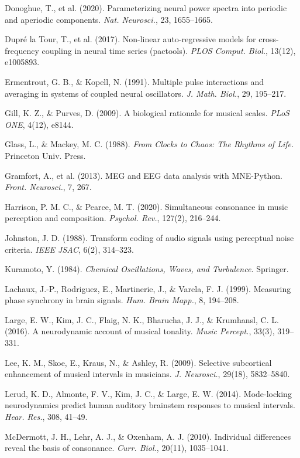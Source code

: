 \documentclass[11pt]{article}
\begin{document}
\begin{list}{}{\setlength{\itemsep}{1pt}\setlength{\leftmargin}{1.2em}\setlength{\itemindent}{-1.2em}}
\item Donoghue, T., et al. (2020). Parameterizing neural power spectra into periodic and aperiodic components. \emph{Nat. Neurosci.}, 23, 1655–1665.
\item Dupré la Tour, T., et al. (2017). Non-linear auto-regressive models for cross-frequency coupling in neural time series (pactools). \emph{PLOS Comput. Biol.}, 13(12), e1005893.
\item Ermentrout, G. B., \& Kopell, N. (1991). Multiple pulse interactions and averaging in systems of coupled neural oscillators. \emph{J. Math. Biol.}, 29, 195–217.
\item Gill, K. Z., \& Purves, D. (2009). A biological rationale for musical scales. \emph{PLoS ONE}, 4(12), e8144.
\item Glass, L., \& Mackey, M. C. (1988). \emph{From Clocks to Chaos: The Rhythms of Life.} Princeton Univ. Press.
\item Gramfort, A., et al. (2013). MEG and EEG data analysis with MNE-Python. \emph{Front. Neurosci.}, 7, 267.
\item Harrison, P. M. C., \& Pearce, M. T. (2020). Simultaneous consonance in music perception and composition. \emph{Psychol. Rev.}, 127(2), 216–244.
\item Johnston, J. D. (1988). Transform coding of audio signals using perceptual noise criteria. \emph{IEEE JSAC}, 6(2), 314–323.
\item Kuramoto, Y. (1984). \emph{Chemical Oscillations, Waves, and Turbulence.} Springer.
\item Lachaux, J.-P., Rodriguez, E., Martinerie, J., \& Varela, F. J. (1999). Measuring phase synchrony in brain signals. \emph{Hum. Brain Mapp.}, 8, 194–208.
\item Large, E. W., Kim, J. C., Flaig, N. K., Bharucha, J. J., \& Krumhansl, C. L. (2016). A neurodynamic account of musical tonality. \emph{Music Percept.}, 33(3), 319–331.
\item Lee, K. M., Skoe, E., Kraus, N., \& Ashley, R. (2009). Selective subcortical enhancement of musical intervals in musicians. \emph{J. Neurosci.}, 29(18), 5832–5840.
\item Lerud, K. D., Almonte, F. V., Kim, J. C., \& Large, E. W. (2014). Mode-locking neurodynamics predict human auditory brainstem responses to musical intervals. \emph{Hear. Res.}, 308, 41–49.
\item McDermott, J. H., Lehr, A. J., \& Oxenham, A. J. (2010). Individual differences reveal the basis of consonance. \emph{Curr. Biol.}, 20(11), 1035–1041.

\end{list}
\end{document}
